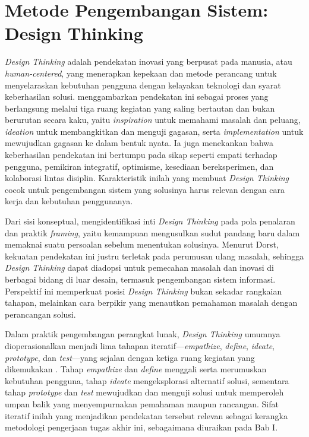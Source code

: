 \section{Metode Pengembangan Sistem: Design Thinking}
\label{sec:design-thinking}

\textit{Design Thinking} adalah pendekatan inovasi yang berpusat pada manusia, atau \textit{human-centered}, yang menerapkan kepekaan dan metode perancang untuk menyelaraskan kebutuhan pengguna dengan kelayakan teknologi dan syarat keberhasilan solusi. \textcite{brown2008} menggambarkan pendekatan ini sebagai proses yang berlangsung melalui tiga ruang kegiatan yang saling bertautan dan bukan berurutan secara kaku, yaitu \textit{inspiration} untuk memahami masalah dan peluang, \textit{ideation} untuk membangkitkan dan menguji gagasan, serta \textit{implementation} untuk mewujudkan gagasan ke dalam bentuk nyata. Ia juga menekankan bahwa keberhasilan pendekatan ini bertumpu pada sikap seperti empati terhadap pengguna, pemikiran integratif, optimisme, kesediaan bereksperimen, dan kolaborasi lintas disiplin. Karakteristik inilah yang membuat \textit{Design Thinking} cocok untuk pengembangan sistem yang solusinya harus relevan dengan cara kerja dan kebutuhan penggunanya.

Dari sisi konseptual, \textcite{dorst2011} mengidentifikasi inti \textit{Design Thinking} pada pola penalaran dan praktik \textit{framing}, yaitu kemampuan mengusulkan sudut pandang baru dalam memaknai suatu persoalan sebelum menentukan solusinya. Menurut Dorst, kekuatan pendekatan ini justru terletak pada perumusan ulang masalah, sehingga \textit{Design Thinking} dapat diadopsi untuk pemecahan masalah dan inovasi di berbagai bidang di luar desain, termasuk pengembangan sistem informasi. Perspektif ini memperkuat posisi \textit{Design Thinking} bukan sekadar rangkaian tahapan, melainkan cara berpikir yang menautkan pemahaman masalah dengan perancangan solusi.

Dalam praktik pengembangan perangkat lunak, \textit{Design Thinking} umumnya dioperasionalkan menjadi lima tahapan iteratif---\textit{empathize}, \textit{define}, \textit{ideate}, \textit{prototype}, dan \textit{test}---yang sejalan dengan ketiga ruang kegiatan yang dikemukakan \textcite{brown2008}. Tahap \textit{empathize} dan \textit{define} menggali serta merumuskan kebutuhan pengguna, tahap \textit{ideate} mengeksplorasi alternatif solusi, sementara tahap \textit{prototype} dan \textit{test} mewujudkan dan menguji solusi untuk memperoleh umpan balik yang menyempurnakan pemahaman maupun rancangan. Sifat iteratif inilah yang menjadikan pendekatan tersebut relevan sebagai kerangka metodologi pengerjaan tugas akhir ini, sebagaimana diuraikan pada Bab I.

